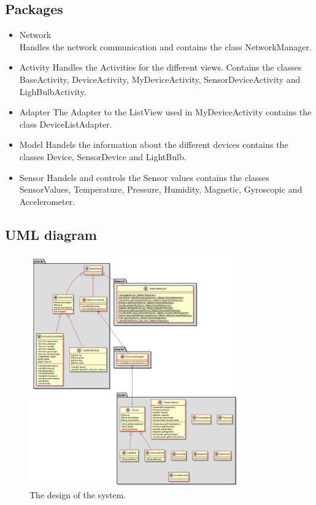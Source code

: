 \documentclass[a4paper]{article}
\begin{document}
	\subsection{Packages}
	\begin{itemize}
		\item Network \\
        Handles the network communication and contains the class NetworkManager.
		\item Activity
        Handles the Activities for the different views. Contains the classes BaseActivity, DeviceActivity, MyDeviceActivity, SensorDeviceActivity and LighBulbActivity.
		\item Adapter
        The Adapter to the ListView used in MyDeviceActivity contains the class DeviceListAdapter.
		\item Model
        Handels the information about the different devices contains the classes Device, SensorDevice and LightBulb.
		\item Sensor
        Handels and controls the Sensor values contains the classes SensorValues, Temperature, Pressure, Humidity, Magnetic, Gyroscopic and Accelerometer.
	\end{itemize}
\subsection{UML diagram}
	\begin{figure}[H]
    \centering
    \includegraphics[width=0.8\textwidth]{class_diagram.png}
    \caption{The design of the system.}
    \label{fig:uml}
\end{figure}
\end{document}
